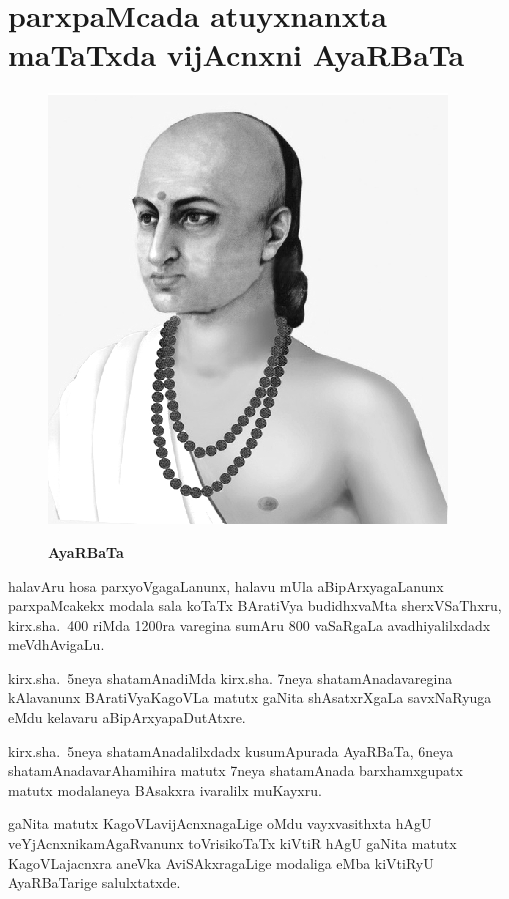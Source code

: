 \chapter{parxpaMcada atuyxnanxta maTaTxda vijAcnxni AyaRBaTa}%

\begin{figure}
  \centering\includegraphics[scale=0.8]{src/figures/aryabhata.eps}
  
  {\bf AyaRBaTa}
    \end{figure}


halavAru hosa parxyoVgagaLanunx, halavu mUla aBipArxyagaLanunx parxpaMcakekx modala sala koTaTx BAratiVya budidhxvaMta sherxVSaThxru, kirx.sha.~{\rm 400} riMda {\rm 1200}ra varegina sumAru {\rm 800} vaSaRgaLa avadhiyalilxdadx meVdhAvigaLu.

kirx.sha.~{\rm 5}neya shatamAnadiMda kirx.sha. {\rm 7}neya shatamAnadavaregina kAlavanunx BAratiVya\break KagoVLa matutx gaNita shAsatxrXgaLa savxNaRyuga eMdu kelavaru aBipArxyapaDutAtxre.

kirx.sha.~{\rm 5}neya shatamAnadalilxdadx kusumApurada AyaRBaTa, {\rm 6}neya shatamAnada\break varAhamihira matutx {\rm 7}neya shatamAnada barxhamxgupatx matutx modalaneya BAsakxra ivaralilx muKayxru.

gaNita matutx KagoVLavijAcnxnagaLige oMdu vayxvasithxta hAgU veYjAcnxnikamAgaR\-vanunx toVrisikoTaTx kiVtiR hAgU gaNita matutx KagoVLajacnxra aneVka AviSAkxragaLige modaliga eMba kiVtiRyU AyaRBaTarige salulxtatxde.

